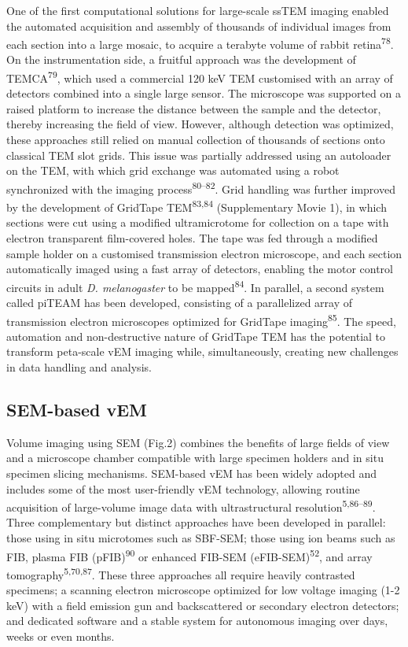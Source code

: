 \documentclass{article}
\begin{document}
One of the first computational solutions for large-scale ssTEM imaging enabled the automated acquisition and assembly of thousands of individual images from each section into a large mosaic, to acquire a terabyte volume of rabbit retina\textsuperscript{78}. On the instrumentation side, a fruitful approach was the development of TEMCA\textsuperscript{79}, which used a commercial 120 keV TEM customised with an array of detectors combined into a single large sensor. The microscope was supported on a raised platform to increase the distance between the sample and the detector, thereby increasing the field of view. However, although detection was optimized, these approaches still relied on manual collection of thousands of sections onto classical TEM slot grids. This issue was partially addressed using an autoloader on the TEM, with which grid exchange was automated using a robot synchronized with the imaging process\textsuperscript{80–82}. Grid handling was further improved by the development of GridTape TEM\textsuperscript{83,84} (Supplementary Movie 1), in which sections were cut using a modified ultramicrotome for collection on a tape with electron transparent film-covered holes. The tape was fed through a modified sample holder on a customised transmission electron microscope, and each section automatically imaged using a fast array of detectors, enabling the motor control circuits in adult \emph{D. melanogaster} to be mapped\textsuperscript{84}. In parallel, a second system called piTEAM has been developed, consisting of a parallelized array of transmission electron microscopes optimized for GridTape imaging\textsuperscript{85}. The speed, automation and non-destructive nature of GridTape TEM has the potential to transform peta-scale vEM imaging while, simultaneously, creating new challenges in data handling and analysis.

\subsection*{SEM-based vEM}

Volume imaging using SEM (Fig.2) combines the benefits of large fields of view and a microscope chamber compatible with large specimen holders and in situ specimen slicing mechanisms. SEM-based vEM has been widely adopted and includes some of the most user-friendly vEM technology, allowing routine acquisition of large-volume image data with ultrastructural resolution\textsuperscript{5,86–89}. Three complementary but distinct approaches have been developed in parallel: those using in situ microtomes such as SBF-SEM; those using ion beams such as FIB, plasma FIB (pFIB)\textsuperscript{90} or enhanced FIB-SEM (eFIB-SEM)\textsuperscript{52}, and array tomography\textsuperscript{5,70,87}. These three approaches all require heavily contrasted specimens; a scanning electron microscope optimized for low voltage imaging (1-2 keV) with a field emission gun and backscattered or secondary electron detectors; and dedicated software and a stable system for autonomous imaging over days, weeks or even months.
\end{document}
